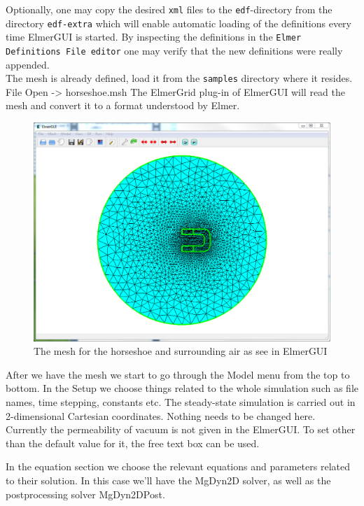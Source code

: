 Optionally, one may copy the desired \texttt{xml} files to the \texttt{edf}-directory from the 
directory \texttt{edf-extra} which will enable automatic loading of the 
definitions every time ElmerGUI is started. By inspecting the definitions in 
the \texttt{Elmer Definitions File editor} one
may verify that the new definitions were really appended.\\

The mesh is already defined, load it from the \texttt{samples} directory where it resides.
\ttbegin
File 
  Open -> horseshoe.msh
\ttend
The ElmerGrid plug-in of ElmerGUI will read the mesh and convert it to a format understood by Elmer. 

\begin{figure}[h]
\centering
\includegraphics[width=140mm]{HorseShoeMesh}
\caption{The mesh for the horseshoe and surrounding air as see in ElmerGUI}\label{fg:horseshoeselmergui}
\end{figure}  


After we have the mesh we start to go through the Model menu from the top to bottom. 
In the Setup we choose things related to the whole simulation such as file names, 
time stepping, constants etc.
The steady-state simulation is carried out in 2-dimensional Cartesian
coordinates. Nothing needs to be changed here. Currently the permeability of vacuum is not given
in the ElmerGUI. To set other than the default value for it, the free text box can be used. 

In the equation section we choose the relevant equations and parameters related to their solution. 
In this case we'll have the MgDyn2D solver, as well as the postprocessing solver MgDyn2DPost.

